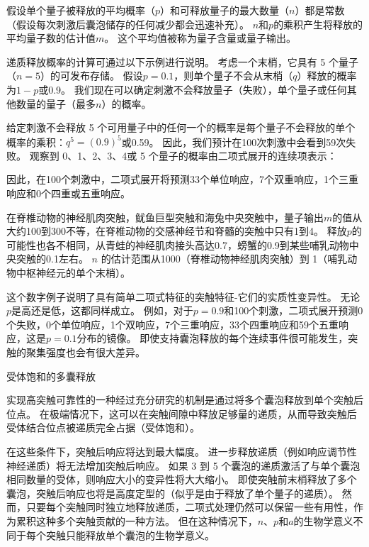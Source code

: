 \begin{proposition}[突触强度取决于递质释放的概率和其他量子参数]
	\quad \quad 假设单个量子被释放的平均概率（$ p $）和可释放量子的最大数量（$ n $）都是常数（假设每次刺激后囊泡储存的任何减少都会迅速补充）。
	$ n $和$ p $的乘积产生将释放的平均量子数的估计值$ m $。
	这个平均值被称为量子含量或量子输出。
	
	\quad \quad 递质释放概率的计算可通过以下示例进行说明。
	考虑一个末梢，它具有 5 个量子（$ n=5 $）的可发布存储。
	假设$ p=0.1 $，则单个量子不会从末梢（$ q $）释放的概率为$ 1-p $或0.9。
	我们现在可以确定刺激不会释放量子（失败），单个量子或任何其他数量的量子（最多$ n $）的概率。
	
	\quad \quad 给定刺激不会释放 5 个可用量子中的任何一个的概率是每个量子不会释放的单个概率的乘积：$ q^5 = (0.9)^5 $或0.59。
	因此，我们预计在100次刺激中会看到59次失败。
	观察到 0、1、2、3、4或 5 个量子的概率由二项式展开的连续项表示：
	
	\quad \quad 因此，在100个刺激中，二项式展开将预测33个单位响应，7个双重响应，1个三重响应和0个四重或五重响应。
	
	\quad \quad 在脊椎动物的神经肌肉突触，鱿鱼巨型突触和海兔中央突触中，量子输出$m$的值从大约100到300不等，在脊椎动物的交感神经节和脊髓的突触中只有1到4。
	释放$ p $的可能性也各不相同，从青蛙的神经肌肉接头高达0.7，螃蟹的0.9到某些哺乳动物中央突触的0.1左右。
	$n$ 的估计范围从1000（脊椎动物神经肌肉突触）到 1（哺乳动物中枢神经元的单个末梢）。
	
	\quad \quad 这个数字例子说明了具有简单二项式特征的突触特征-它们的实质性变异性。
	无论$p$是高还是低，这都同样成立。
	例如，对于$ p=0.9 $和100个刺激，二项式展开预测0个失败，0个单位响应，1个双响应，7个三重响应，33个四重响应和59个五重响应，这是$ p=0.1 $分布的镜像。
	即使支持囊泡释放的每个连续事件很可能发生，突触的聚集强度也会有很大差异。
	
	\quad \quad 受体饱和的多囊释放
	
	\quad \quad 实现高突触可靠性的一种经过充分研究的机制是通过将多个囊泡释放到单个突触后位点。
	在极端情况下，这可以在突触间隙中释放足够量的递质，从而导致突触后受体结合位点被递质完全占据（受体饱和）。
	
	\quad \quad 在这些条件下，突触后响应将达到最大幅度。
	进一步释放递质（例如响应调节性神经递质）将无法增加突触后响应。
	如果 3 到 5 个囊泡的递质激活了与单个囊泡相同数量的受体，则响应大小的变异性将大大缩小。
	即使突触前末梢释放了多个囊泡，突触后响应也将是高度定型的（似乎是由于释放了单个量子的递质）。
	然而，只要每个突触同时独立地释放递质，二项式处理仍然可以保留一些有用性，作为累积这种多个突触贡献的一种方法。
	但在这种情况下，$ n $、$ p $和$ a $的生物学意义不同于每个突触只能释放单个囊泡的生物学意义。
	
\end{proposition}



